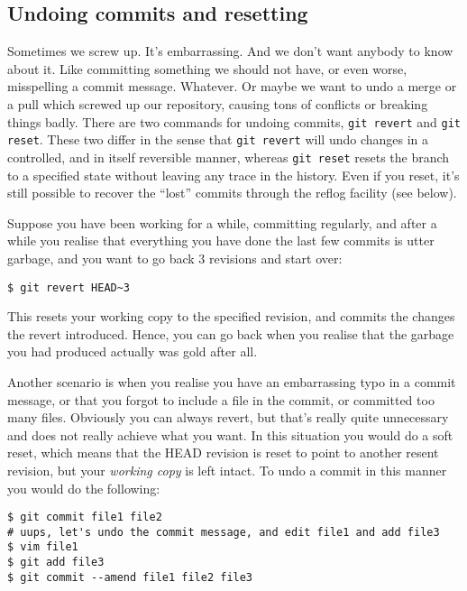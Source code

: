 \documentclass[a4paper,10pt]{article}
\begin{document}
\subsection{Undoing commits and resetting}
Sometimes we screw up. It's embarrassing. And we don't want anybody to know
about it. Like committing something we should not have, or even worse,
misspelling a commit message. Whatever. Or maybe we want to undo a merge or a
pull which screwed up our repository, causing tons of conflicts or breaking
things badly. There are two commands for undoing commits, \texttt{git revert}
and \texttt{git reset}. These two differ in the sense that \texttt{git revert}
will undo changes in a controlled, and in itself reversible manner, whereas
\texttt{git reset} resets the branch to a specified state without leaving any
trace in the history. Even if you reset, it's still possible to recover
the ``lost'' commits through the reflog facility (see below). 

Suppose you have been working for a while, committing regularly, and after a
while you realise that everything you have done the last few commits is utter
garbage, and you want to go back 3 revisions and start over:
\begin{verbatim}
$ git revert HEAD~3
\end{verbatim}
This resets your working copy to the specified revision, and commits the
changes the revert introduced. Hence, you can go back when you realise that
the garbage you had produced actually was gold after all.

Another scenario is when you realise you have an embarrassing typo in a commit
message, or that you forgot to include a file in the commit, or committed
too many files. Obviously you can always revert, but that's really quite
unnecessary and does not really achieve what you want. In this situation you
would do a soft reset, which means that the HEAD revision is reset to point to 
another resent revision, but your \emph{working copy} is left intact. To undo
a commit in this manner you would do the following:
\begin{verbatim}
$ git commit file1 file2 
# uups, let's undo the commit message, and edit file1 and add file3 
$ vim file1 
$ git add file3
$ git commit --amend file1 file2 file3
\end{verbatim}
\end{document}
